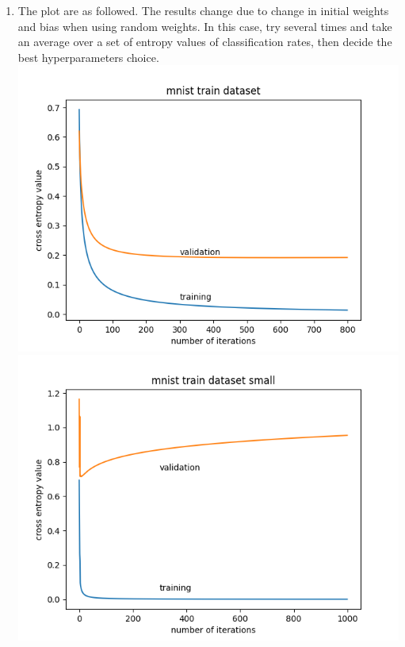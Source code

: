 \documentclass[12pt]{article}
\begin{document}
\begin{enumerate}[label=\alph*)]
		\item The plot are as followed. The results change due to change in initial weights and bias when using random weights. In this case, try several times and take an average over a set of entropy values of classification rates, then decide the best hyperparameters choice.\\ \includegraphics[scale=0.5]{3.2c1.png}\includegraphics[scale=0.5]{3.2c2.png}
		
	\end{enumerate}
	\newpage
	
\end{document}
